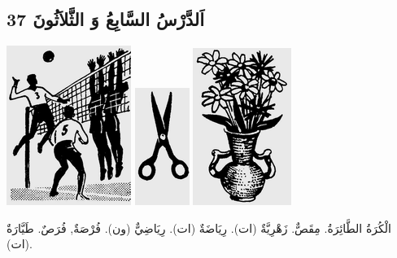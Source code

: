 \documentclass[a5paper]{article}
\begin{document}
\subsection[اَلدَّرْسُ السَّابِعُ وَ الثَّلاَثُونَ 37]{اَلدَّرْسُ السَّابِعُ وَ الثَّلاَثُونَ 37}
 \includegraphics[width=1.5937in,height=2.0417in]{images/MuhammadBagauddinprettified-img087.png}   \includegraphics[width=0.698in,height=1.5in]{images/MuhammadBagauddinprettified-img088.png}   \includegraphics[width=1.2602in,height=2.0102in]{images/MuhammadBagauddinprettified-img089.png} 

الْكُرَةُ الطَّائِرَةُ. مِقَصٌّ. زَهْرِيَّةٌ (ات). رِيَاضَةٌ (ات). رِيَاضِيٌّ (ون). فُرْصَةٌ, فُرَصٌ. طَيَّارَةٌ (ات).
\end{document}
